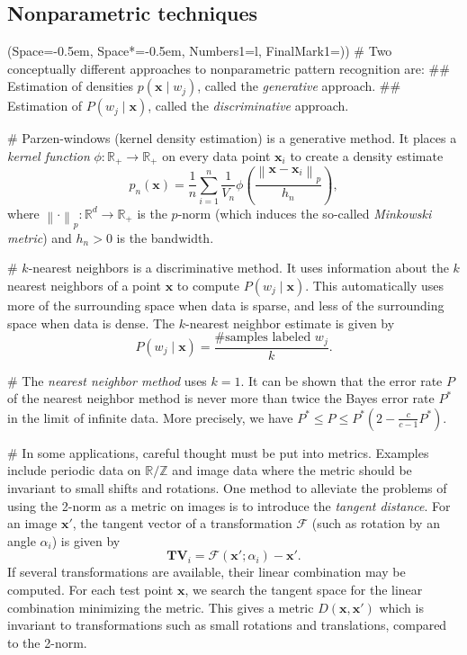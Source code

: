 \documentclass[12pt, a4paper]{article}
\newcommand{\listSpace}{-0.5em}%
\newcommand{\R}{\mathbb{R}}
\newcommand{\F}{\mathcal{F}}
\newcommand{\Z}{\mathbb{Z}}
\newcommand{\vect}[1]{\bm{#1}}
\newcommand{\norm}[1]{\left\lVert#1\right\rVert}
\begin{document}
\subsection{Nonparametric techniques}
\begin{easylist}[itemize]
\ListProperties(Space=\listSpace, Space*=\listSpace, Numbers1=l, FinalMark1={)})
# Two conceptually different approaches to nonparametric pattern recognition are: 
## Estimation of densities $p(\vect{x} \mid w_j)$, called the \emph{generative} approach.
## Estimation of $P(w_j \mid \vect{x})$, called the \emph{discriminative} approach.

# Parzen-windows (kernel density estimation) is a generative method. 
It places a \emph{kernel function} $\phi: \R_+ \to \R_+$ on every data point $\vect{x}_i$ to create a density estimate
\begin{equation*}
	p_n(\vect{x}) = \frac{1}{n} \sum_{i=1}^{n} \frac{1}{V_n} 
	\phi \left( \frac{\norm{\vect{x} - \vect{x}_i}_p}{h_n}  \right),
\end{equation*}
where $\norm{\cdot}_p: \R^d \to \R_+$ is the $p$-norm (which induces the so-called \emph{Minkowski metric}) and $h_n > 0$ is the bandwidth.

# $k$-nearest neighbors is a discriminative method.
It uses information about the $k$ nearest neighbors of a point $\vect{x}$ to compute $P(w_j \mid \vect{x})$.
This automatically uses more of the surrounding space when data is sparse, and less of the surrounding space when data is dense.
The $k$-nearest neighbor estimate is given by
\begin{equation*}
	P(w_j \mid \vect{x}) = \frac{\text{\# samples labeled } w_j}{k}.
\end{equation*}

# The \emph{nearest neighbor method} uses $k= 1$.
It can be shown that the error rate $P$ of the nearest neighbor method is never more than twice the Bayes error rate $P^*$ in the limit of infinite data.
More precisely, we have $P^* \leq P \leq P^* (2 - \frac{c}{c-1} P^*)$.

# In some applications, careful thought must be put into metrics.
Examples include periodic data on $\R / \Z$ and image data where the metric should be invariant to small shifts and rotations.
One method to alleviate the problems of using the 2-norm as a metric on images is to introduce the \emph{tangent distance}.
For an image $\vect{x}'$, the tangent vector of a transformation $\F$ (such as rotation by an angle $\alpha_i$) is given by
\begin{equation*}
	\vect{TV}_i = \F\left(\vect{x}'; \alpha_i \right) - \vect{x}'.
\end{equation*}
If several transformations are available, their linear combination may be computed.
For each test point $\vect{x}$, we search the tangent space for the linear  combination minimizing the metric.
This gives a metric $D(\vect{x}, \vect{x}')$ which is invariant to transformations such as small rotations and translations, compared to the 2-norm.


\end{easylist}
\end{document}
